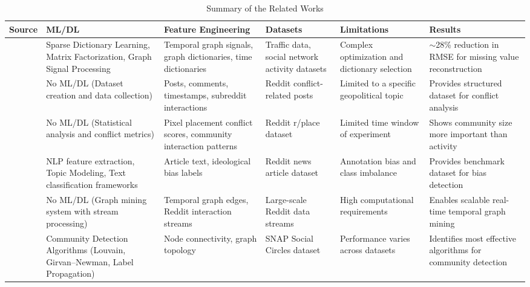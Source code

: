 \documentclass[a4paper,fleqn]{cas-dc}
\begin{document}
{\small
\renewcommand{\arraystretch}{1.0}
\setlength{\tabcolsep}{3pt}
\begin{table}[h!]
\caption{Summary of the Related Works}
\label{tab:summary_all}
\begin{tabularx}{\textwidth}{|>{\raggedright\arraybackslash}p{}|>{\raggedright\arraybackslash}p{}|>{\raggedright\arraybackslash}p{}|>{\raggedright\arraybackslash}p{}|>{\raggedright\arraybackslash}p{}|>{\raggedright\arraybackslash}X|}
\hline
\textbf{Source} & \textbf{ML/DL} & \textbf{Feature Engineering} & \textbf{Datasets} & \textbf{Limitations} & \textbf{Results} \\
\hline

\cite{1_Mcneil2021} & Sparse Dictionary Learning, Matrix Factorization, Graph Signal Processing & Temporal graph signals, graph dictionaries, time dictionaries & Traffic data, social network activity datasets & Complex optimization and dictionary selection & $\sim$28\% reduction in RMSE for missing value reconstruction \\ 
\hline

\cite{2_Zhu2022} & No ML/DL (Dataset creation and data collection) & Posts, comments, timestamps, subreddit interactions & Reddit conflict-related posts & Limited to a specific geopolitical topic & Provides structured dataset for conflict analysis \\ 
\hline

\cite{3_Vachher2020} & No ML/DL (Statistical analysis and conflict metrics) & Pixel placement conflict scores, community interaction patterns & Reddit r/place dataset & Limited time window of experiment & Shows community size more important than activity \\ 
\hline

\cite{4_Ravi2024} & NLP feature extraction, Topic Modeling, Text classification frameworks & Article text, ideological bias labels & Reddit news article dataset & Annotation bias and class imbalance & Provides benchmark dataset for bias detection \\ 
\hline

\cite{5_Huber2022} & No ML/DL (Graph mining system with stream processing) & Temporal graph edges, Reddit interaction streams & Large-scale Reddit data streams & High computational requirements & Enables scalable real-time temporal graph mining \\ 
\hline

\cite{6_Malode2025} & Community Detection Algorithms (Louvain, Girvan–Newman, Label Propagation) & Node connectivity, graph topology & SNAP Social Circles dataset & Performance varies across datasets & Identifies most effective algorithms for community detection \\ 
\hline


\end{tabularx}
\end{table}}
\end{document}
